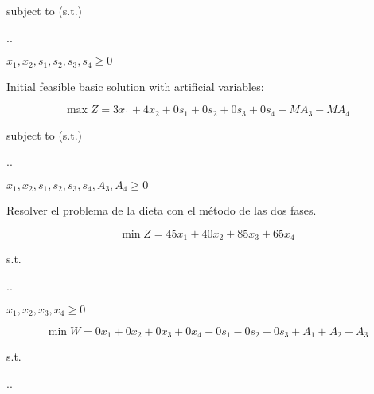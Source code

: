 \documentclass[spanish,letterpaper,11pt]{exam}
\begin{document}
\begin{questions}
\begin{solution}
    {\centering
      subject to (s.t.)
  
      \sysdelim..%
  
      \vspace{5mm}
  
      $x_1 , x_2, s_1, s_2, s_3, s_4 \geq 0$
    \par}
    

    Initial feasible basic solution with artificial variables:

    \[\max Z = 3x_1 + 4x_2 + 0s_1 + 0s_2 + 0s_3 + 0s_4 - MA_3 - MA_4\]

    {\centering
      subject to (s.t.)
  
      \sysdelim..%
  
      \vspace{5mm}
  
      $x_1 , x_2, s_1, s_2, s_3, s_4, A_3, A_4 \geq 0$
    \par}
   \end{solution}   

   \vspace{5mm}
   \question
   Resolver el problema de la dieta con el método de las dos fases.

   \[ \min Z = 45x_1 + 40x_2 + 85x_3 + 65x_4   \]

    {\centering
      s.t.  %
      
    
      \sysdelim..%

    $x_1, x_2, x_3, x_4 \geq 0$
  \par}

  \begin{solution}
    
    \[ \min W = 0x_1 + 0x_2 + 0x_3 + 0x_4 - 0s_1 - 0s_2 - 0s_3  + A_1 + A_2 + A_3 \]

    {\centering
      s.t.  %
      
      \sysdelim..%

}
\end{solution}
\end{questions}
\end{document}
